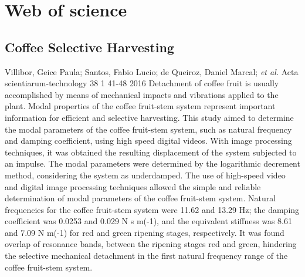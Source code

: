 
\chapter{Web of science}
\label{chap:web-science}

\section{Coffee Selective Harvesting}
\label{sec:coff-select-harv}


{Villibor, Geice Paula; Santos, Fabio Lucio; de Queiroz, Daniel Marcal;
  \textit{et al.}}%
{Acta scientiarum-technology}%
{38}%
{1}%
{41-48}%
{2016}%
{Detachment of coffee fruit is usually accomplished by means of mechanical
  impacts and vibrations applied to the plant. Modal properties of the coffee
  fruit-stem system represent important information for efficient and selective
  harvesting. This study aimed to determine the modal parameters of the coffee
  fruit-stem system, such as natural frequency and damping coefficient, using
  high speed digital videos. With image processing techniques, it was obtained
  the resulting displacement of the system subjected to an impulse. The modal
  parameters were determined by the logarithmic decrement method, considering
  the system as underdamped. The use of high-speed video and digital image
  processing techniques allowed the simple and reliable determination of modal
  parameters of the coffee fruit-stem system. Natural frequencies for the coffee
  fruit-stem system were 11.62 and 13.29 Hz; the damping coefficient was 0.0253
  and 0.029 N s m(-1), and the equivalent stiffness was 8.61 and 7.09 N m(-1)
  for red and green ripening stages, respectively. It was found overlap of
  resonance bands, between the ripening stages red and green, hindering the
  selective mechanical detachment in the first natural frequency range of the
  coffee fruit-stem system.}%


